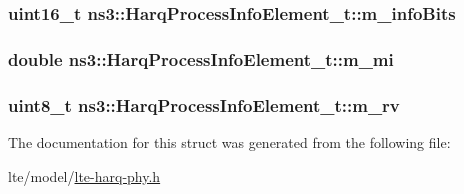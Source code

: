 \subsubsection[{\texorpdfstring{m\+\_\+info\+Bits}{m_infoBits}}]{\setlength{\rightskip}{0pt plus 5cm}uint16\+\_\+t ns3\+::\+Harq\+Process\+Info\+Element\+\_\+t\+::m\+\_\+info\+Bits}\hypertarget{structns3_1_1HarqProcessInfoElement__t_a993fc3272b852d41fddf6e35aa6dcf18}{}\label{structns3_1_1HarqProcessInfoElement__t_a993fc3272b852d41fddf6e35aa6dcf18}
\subsubsection[{\texorpdfstring{m\+\_\+mi}{m_mi}}]{\setlength{\rightskip}{0pt plus 5cm}double ns3\+::\+Harq\+Process\+Info\+Element\+\_\+t\+::m\+\_\+mi}\hypertarget{structns3_1_1HarqProcessInfoElement__t_ae2ebcd07f80854bedff98772eadfdc58}{}\label{structns3_1_1HarqProcessInfoElement__t_ae2ebcd07f80854bedff98772eadfdc58}
\subsubsection[{\texorpdfstring{m\+\_\+rv}{m_rv}}]{\setlength{\rightskip}{0pt plus 5cm}uint8\+\_\+t ns3\+::\+Harq\+Process\+Info\+Element\+\_\+t\+::m\+\_\+rv}\hypertarget{structns3_1_1HarqProcessInfoElement__t_a9a0bd2f26b59ceb77e214f5246c09f47}{}\label{structns3_1_1HarqProcessInfoElement__t_a9a0bd2f26b59ceb77e214f5246c09f47}


The documentation for this struct was generated from the following file\+:\begin{DoxyCompactItemize}
\item 
lte/model/\hyperlink{lte-harq-phy_8h}{lte-\/harq-\/phy.\+h}\end{DoxyCompactItemize}
